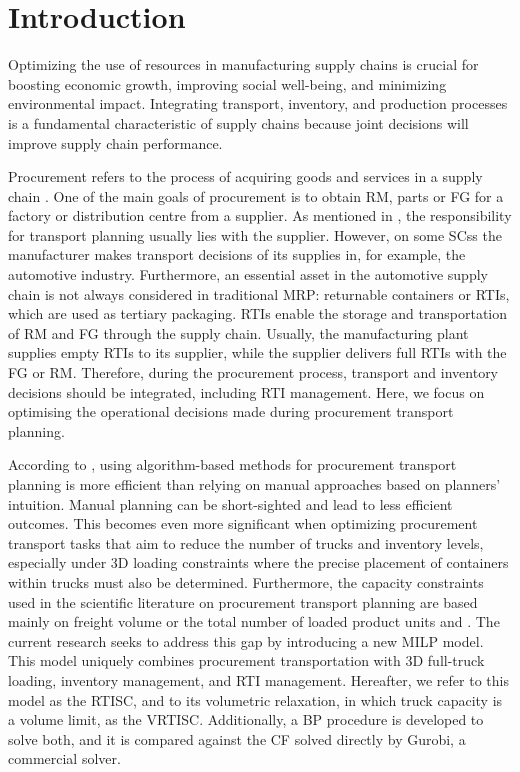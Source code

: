 \section{Introduction}
\label{sec:intro}

Optimizing the use of resources in manufacturing supply chains is crucial for boosting economic growth, improving social well-being, and minimizing environmental impact.
Integrating transport, inventory, and production processes is a fundamental characteristic of supply chains \autocite{Stadtler2015SupplyPlanning} because joint decisions will improve supply chain performance\autocite{Diaz-Madronero2017ADecisions}.

Procurement refers to the process of acquiring goods and services in a supply chain \autocite{Chopra2015SupplyOperation}.
One of the main goals of procurement is to obtain \ac{RM}, parts or \ac{FG} for a factory or distribution centre from a supplier.
As mentioned in \autocite{Fleischmann2015TransportDistribution}, the responsibility for transport planning usually lies with the supplier.
However, on some \acp{SC}s the manufacturer makes transport decisions of its supplies in, for example, the automotive industry.
Furthermore, an essential asset in the automotive supply chain is not always considered in traditional \ac{MRP}: returnable containers or \acfp{RTI}, which are used as tertiary packaging.
\acp{RTI} enable the storage and transportation of \ac{RM} and \ac{FG} through the supply chain.
Usually, the manufacturing plant supplies empty \acp{RTI} to its supplier, while the supplier delivers full \acp{RTI} with the \ac{FG} or \ac{RM}.
Therefore, during the procurement process, transport and inventory decisions should be integrated, including \ac{RTI} management.
Here, we focus on optimising the operational decisions made during procurement transport planning.

According to \autocite{Diaz-Madronero2014AChain}, using algorithm-based methods for procurement transport planning is more efficient than relying on manual approaches based on planners' intuition.
Manual planning can be short-sighted and lead to less efficient outcomes.
This becomes even more significant when optimizing procurement transport tasks that aim to reduce the number of trucks and inventory levels, especially under 3D loading constraints where the precise placement of containers within trucks must also be determined.
Furthermore, the capacity constraints used in the scientific literature on procurement transport planning are based mainly on freight volume or the total number of loaded product units {\autocite{Hashemi-Amiri2023IntegratedApproach} and \autocite{Diaz-Madronero2014AChain}.
	}
The current research seeks to address this gap by introducing a new \ac{MILP} model.
This model uniquely combines procurement transportation with 3D full-truck loading, inventory management, and \ac{RTI} management.
Hereafter, we refer to this model as the \ac{RTISC}, and to its volumetric relaxation, in which truck capacity is a volume limit, as the \ac{VRTISC}.
Additionally, a \ac{BP} procedure is developed to solve both, and it is compared against the \ac{CF} solved directly by Gurobi, a commercial solver.

